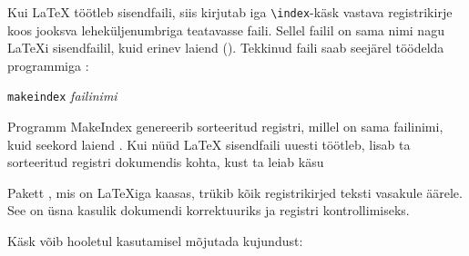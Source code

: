 \begin{table}[!hb]
\caption{Registrivõtmete süntaksi näited}\label{index}%
\end{table}

Kui \LaTeX{} töötleb sisendfaili, siis kirjutab iga \verb|\index|-käsk
vastava registrikirje koos jooksva leheküljenumbriga teatavasse faili.
Sellel failil on sama nimi nagu \LaTeX i sisendfailil, kuid erinev
laiend (). Tekkinud faili saab seejärel töödelda programmiga
:

\begin{lscommand}
  \texttt{makeindex} \emph{failinimi}
\end{lscommand}
\noindent Programm MakeIndex genereerib sorteeritud registri, millel on
sama failinimi, kuid seekord laiend . Kui nüüd \LaTeX{}
sisendfaili uuesti töötleb, lisab ta sorteeritud registri dokumendis
kohta, kust ta leiab käsu
\begin{lscommand}
\end{lscommand}

Pakett , mis on \LaTeX iga kaasas, trükib kõik
registrikirjed teksti vasakule äärele. See on üsna kasulik dokumendi
korrektuuriks ja registri kontrollimiseks.

Käsk  võib hooletul kasutamisel
mõjutada kujundust:

